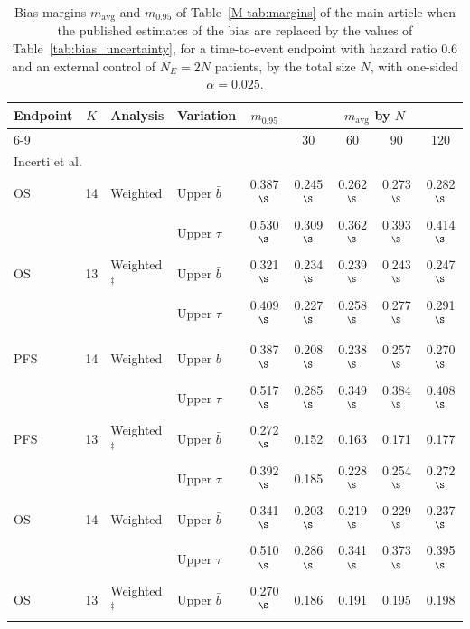 \begin{table}[!htb]
\centering
\small
\setlength{\tabcolsep}{3pt}
\caption{Bias margins $m_{\mathrm{avg}}$ and $m_{0.95}$ of Table~\ref{M-tab:margins} of the main article when the published estimates of the bias are replaced by the values of Table~\ref{tab:bias_uncertainty}, for a time-to-event endpoint with hazard ratio 0.6 and an external control of $N_E = 2N$ patients, by the total size $N$, with one-sided $\alpha = 0.025$.}
\label{tab:margin_uncertainty}
\begin{tabular}{lcllccccc}
\toprule
Endpoint & $K$ & Analysis & Variation & $m_{0.95}$ & \multicolumn{4}{c}{$m_{\mathrm{avg}}$ by $N$} \\
\cmidrule(lr){6-9}
 & & & & & 30 & 60 & 90 & 120 \\
\midrule
\multicolumn{9}{l}{Incerti et al.~\cite{Incerti2023}} \\
OS & 14 & Weighted & Upper $\bar{b}$ & 0.387$^{\S}$ & 0.245$^{\S}$ & 0.262$^{\S}$ & 0.273$^{\S}$ & 0.282$^{\S}$ \\
 &  &  & Upper $\tau$ & 0.530$^{\S}$ & 0.309$^{\S}$ & 0.362$^{\S}$ & 0.393$^{\S}$ & 0.414$^{\S}$ \\
OS & 13 & Weighted$^{\ddagger}$ & Upper $\bar{b}$ & 0.321$^{\S}$ & 0.234$^{\S}$ & 0.239$^{\S}$ & 0.243$^{\S}$ & 0.247$^{\S}$ \\
 &  &  & Upper $\tau$ & 0.409$^{\S}$ & 0.227$^{\S}$ & 0.258$^{\S}$ & 0.277$^{\S}$ & 0.291$^{\S}$ \\
\addlinespace
\multicolumn{9}{l}{Bahmane et al.~\cite{Bahmane2025}} \\
PFS & 14 & Weighted & Upper $\bar{b}$ & 0.387$^{\S}$ & 0.208$^{\S}$ & 0.238$^{\S}$ & 0.257$^{\S}$ & 0.270$^{\S}$ \\
 &  &  & Upper $\tau$ & 0.517$^{\S}$ & 0.285$^{\S}$ & 0.349$^{\S}$ & 0.384$^{\S}$ & 0.408$^{\S}$ \\
PFS & 13 & Weighted$^{\ddagger}$ & Upper $\bar{b}$ & 0.272$^{\S}$ & 0.152 & 0.163 & 0.171 & 0.177 \\
 &  &  & Upper $\tau$ & 0.392$^{\S}$ & 0.185 & 0.228$^{\S}$ & 0.254$^{\S}$ & 0.272$^{\S}$ \\
OS & 14 & Weighted & Upper $\bar{b}$ & 0.341$^{\S}$ & 0.203$^{\S}$ & 0.219$^{\S}$ & 0.229$^{\S}$ & 0.237$^{\S}$ \\
 &  &  & Upper $\tau$ & 0.510$^{\S}$ & 0.286$^{\S}$ & 0.341$^{\S}$ & 0.373$^{\S}$ & 0.395$^{\S}$ \\
OS & 13 & Weighted$^{\ddagger}$ & Upper $\bar{b}$ & 0.270$^{\S}$ & 0.186 & 0.191 & 0.195 & 0.198 \\

\end{tabular}
\end{table}
